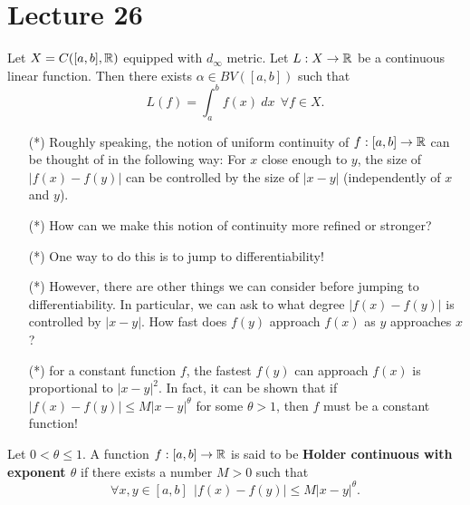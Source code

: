 \section{Lecture 26}

\begin{theorem}
    Let \( X = C([a,b], \mathbb{R} ) \) equipped with \( {d}_{\infty } \) metric. Let \( L : X \to \mathbb{R}  \) be a continuous linear function. Then there exists \( \alpha \in BV ([a,b]) \) such that 
    \[  L(f) = \int_{ a }^{ b } f(x) \ dx \ \ \forall f \in X. \]
\end{theorem}

\begin{remark}
    \begin{enumerate}
        \item[(*)] Roughly speaking, the notion of uniform continuity of \( f:[a,b] \to \mathbb{R}  \) can be thought of in the following way: For \( x  \) close enough to \( y \), the size of \( | f(x) - f(y) |  \) can be controlled by the size of \( | x - y  |  \) (independently of \( x  \) and \( y \)).
        \item[(*)] How can we make this notion of continuity more refined or stronger?
        \item[(*)] One way to do this is to jump to differentiability!
    \end{enumerate}
\end{remark}

\begin{remark}
   \begin{enumerate}
       \item[(*)] However, there are other things we can consider before jumping to differentiability. In particular, we can ask to what degree \( | f(x) - f(y) |  \) is controlled by \( | x - y  | \). How fast does \( f(y) \) approach \( f(x) \) as \( y  \) approaches \( x  \)?
        \item[(*)] for a constant function \( f  \), the fastest \( f(y) \) can approach \( f(x) \) is proportional to \( | x - y  |^{2} \). In fact, it can be shown that if \( | f(x) - f(y) |  \leq M |  x - y  |^{\theta} \) for some \( \theta > 1  \), then \( f  \) must be a constant function!
   \end{enumerate} 
\end{remark}

\begin{definition}
    Let \( 0 < \theta \leq 1  \). A function \( f: [a,b] \to \mathbb{R}  \) is said to be \textbf{Holder continuous with exponent \( \theta \)} if there exists a number \( M > 0  \) such that 
    \[  \forall x ,y \in [a,b] \ \ | f(x) - f(y) |  \leq M |  x-  y  |^{\theta}. \]
\end{definition}

